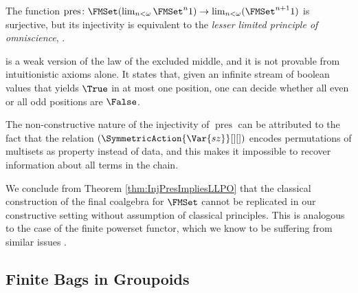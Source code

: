 \documentclass{easychair}
\begin{document}
  \begin{theorem}\label{thm:InjPresImpliesLLPO}
    The function 
        $\operatorname{pres}\colon
            \FMSet (\lim_{n < \omega} \FMSet^n 1)
            \to
            \lim_{n < \omega} (\FMSet^{n+1} 1)$
    is surjective,
    but its injectivity is equivalent to the \emph{lesser limited principle of omniscience}, \LLPO.
  \end{theorem}
  \LLPO{} \cite[{Ch.\@ 1}]{Bridges1987} is a weak version of the law
  of the excluded middle, and it is not provable from intuitionistic
  axioms alone.  It states that, given an infinite stream of boolean
  values that yields $\True$ in at most one position, one can decide
  whether all even or all odd positions are $\False$.

  The non-constructive nature of the injectivity of
  $\operatorname{pres}$ can be attributed to the fact that the
  relation $(\SymmetricAction{\Var{sz}}[][])$ encodes permutations of
  multisets as property instead of data, and this makes it impossible
  to recover information about all terms in the chain.

  We conclude from Theorem \ref{thm:InjPresImpliesLLPO} that the
  classical construction of the final coalgebra for $\FMSet$ cannot be
  replicated in our constructive setting without assumption of
  classical principles. This is analogous to the case of the finite
  powerset functor, which we know to be suffering from similar issues \cite{Veltri2021}.

  \subsection*{Finite Bags in Groupoids}
\end{document}

